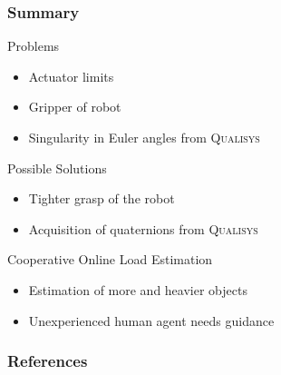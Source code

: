 \documentclass[student,noshadow]{ITRslides}
\begin{document}
\begin{frame}
	\frametitle{Summary}
	\begin{block}{Problems}
		\begin{itemize}
			\item Actuator limits
			\item Gripper of robot
			\item Singularity in Euler angles from \textsc{Qualisys}
		\end{itemize}	   
	\end{block}	
	\begin{block}{Possible Solutions}
		\begin{itemize}
			\item Tighter grasp of the robot
			\item Acquisition of quaternions from \textsc{Qualisys}
		\end{itemize}  
	\end{block}	
	\begin{block}{Cooperative Online Load Estimation}
		\begin{itemize}
			\item Estimation of more and heavier objects
			\item Unexperienced human agent needs guidance
		\end{itemize}
	\end{block}	
\end{frame}

\appendix
\begin{frame}
	\frametitle{References}
	\printbibliography
\end{frame}
\end{document}
